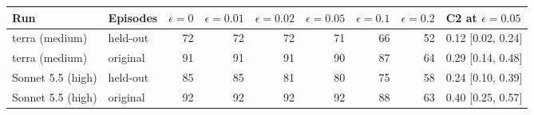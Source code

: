 \begin{tabular}{@{}llrrrrrrl@{}}
\toprule
Run & Episodes & $\epsilon=0$ & $\epsilon=0.01$ & $\epsilon=0.02$ & $\epsilon=0.05$ & $\epsilon=0.1$ & $\epsilon=0.2$ & C2 at $\epsilon=0.05$ \\
\midrule
terra (medium) & held-out & 72 & 72 & 72 & 71 & 66 & 52 & 0.12 [0.02, 0.24] \\
terra (medium) & original & 91 & 91 & 91 & 90 & 87 & 64 & 0.29 [0.14, 0.48] \\
Sonnet 5.5 (high) & held-out & 85 & 85 & 81 & 80 & 75 & 58 & 0.24 [0.10, 0.39] \\
Sonnet 5.5 (high) & original & 92 & 92 & 92 & 92 & 88 & 63 & 0.40 [0.25, 0.57] \\
\bottomrule
\end{tabular}
